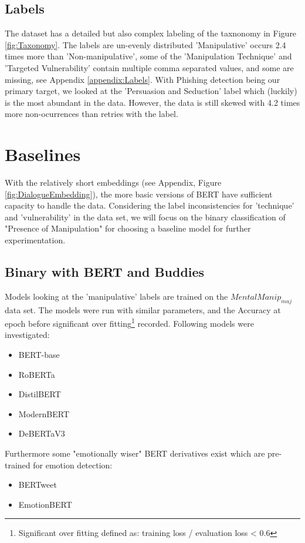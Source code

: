 \documentclass[
	letterpaper, %
	12pt, %
	unnumberedsections, %
	twoside, %
]{LTJournalArticle}
\begin{document}
\subsection{Labels}
The dataset has a detailed but also complex labeling of the taxnonomy in Figure \ref{fig:Taxonomy}. The labels are un-evenly distributed 'Manipulative' occurs 2.4 times more than 'Non-manipulative', some of the 'Manipulation Technique' and 'Targeted Vulnerability' contain multiple comma separated values, and some are missing, see Appendix \ref{appendix:Labels}. With Phishing detection being our primary target, we looked at the 'Persuasion and Seduction' label which (luckily) is the most abundant in the data. However, the data is still skewed with 4.2 times more non-ocurrences than retries with the label.



\section{Baselines}
With the relatively short embeddings (see Appendix, Figure \ref{fig:DialogueEmbedding}), the more basic versions of BERT have sufficient capacity to handle the data.
Considering the label inconsistencies for 'technique' and 'vulnerability' in the data set, we will focus on the binary classification of "Presence of Manipulation" for choosing a baseline model for further experimentation.


\subsection{Binary with BERT and Buddies}
Models looking at the 'manipulative' labels are trained on the $MentalManip_{maj}$ data set. The models were run with similar parameters, and the Accuracy at epoch before significant over fitting\footnote{Significant over fitting defined as: training loss / evaluation loss < 0.6} recorded. Following models were investigated:
\begin{itemize}
	\item BERT-base \cite{BERT-base}
	\item RoBERTa \cite{RoBERTa}
	\item DistilBERT \cite{DistilBERT}
	\item ModernBERT \cite{ModernBERT}
	\item DeBERTaV3 \cite{DeBERTaV3}
\end{itemize}
Furthermore some "emotionally wiser" BERT derivatives exist which are pre-trained for emotion detection:
\begin{itemize}
	\item BERTweet \cite{BERTweet}
	\item EmotionBERT \cite{EmotionBERT}
\end{itemize}
\end{document}
